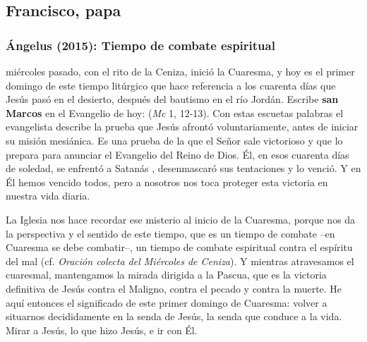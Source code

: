 \newsection
\subsection{Francisco, papa}

\subsubsection{Ángelus (2015): Tiempo de combate espiritual}


\begin{body}
 miércoles pasado, con el rito de la Ceniza, inició la Cuaresma, y hoy es el primer domingo de este tiempo litúrgico que hace referencia a los cuarenta días que Jesús pasó en el desierto, después del bautismo en el río Jordán. Escribe \textbf{san Marcos} en el Evangelio de hoy:  (\textit{Mc} 1, 12-13). Con estas escuetas palabras el evangelista describe la prueba que Jesús afrontó voluntariamente, antes de iniciar su misión mesiánica. Es una prueba de la que el Señor sale victorioso y que lo prepara para anunciar el Evangelio del Reino de Dios. Él, en esos cuarenta días de soledad, se enfrentó a Satanás , desenmascaró sus tentaciones y lo venció. Y en Él hemos vencido todos, pero a nosotros nos toca proteger esta victoria en nuestra vida diaria.

La Iglesia nos hace recordar ese misterio al inicio de la Cuaresma, porque nos da la perspectiva y el sentido de este tiempo, que es un tiempo de combate –en Cuaresma se debe combatir–, un tiempo de combate espiritual contra el espíritu del mal (cf. \textit{Oración colecta del Miércoles de Ceniza}). Y mientras atravesamos el  cuaresmal, mantengamos la mirada dirigida a la Pascua, que es la victoria definitiva de Jesús contra el Maligno, contra el pecado y contra la muerte. He aquí entonces el significado de este primer domingo de Cuaresma: volver a situarnos decididamente en la senda de Jesús, la senda que conduce a la vida. Mirar a Jesús, lo que hizo Jesús, e ir con Él.


\end{body}
